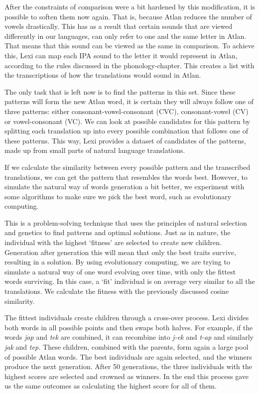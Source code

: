 After the constraints of comparison were a bit hardened by this modification, it is possible to soften them now again. That is, because Atlan reduces the number of vowels drastically. This has as a result that certain sounds that are viewed differently in our languages, can only refer to one and the same letter in Atlan. That means that this sound can be viewed as the same in comparison. To achieve this, Lexi can map each IPA sound to the letter it would represent in Atlan, according to the rules discussed in the phonology-chapter. This creates a list with the transcriptions of how the translations would sound in Atlan.  

The only task that is left now is to find the patterns in this set. Since these patterns will form the new Atlan word, it is certain they will always follow one of three patterns: either consonant-vowel-consonant (CVC), consonant-vowel (CV) or vowel-consonant (VC). We can look at possible candidates for this pattern by splitting each translation up into every possible combination that follows one of these patterns. This way, Lexi provides a dataset of candidates of the patterns, made up from small parts of natural language translations. 

If we calculate the similarity between every possible pattern and the transcribed translations, we can get the pattern that resembles the words best. However, to simulate the natural way of words generation a bit better, we experiment with some algorithms to make sure we pick the best word, such as evolutionary computing. 

This is a problem-solving technique that uses the principles of natural selection and genetics to find patterns and optimal solutions. Just as in nature, the individual with the highest ‘fitness’ are selected to create new children. Generation after generation this will mean that only the best traits survive, resulting in a solution. By using evolutionary computing, we are trying to simulate a natural way of one word evolving over time, with only the fittest words surviving. In this case, a ‘fit’ individual is on average very similar to all the translations. We calculate the fitness with the previously discussed cosine similarity. 

The fittest individuals create children through a cross-over process. Lexi divides both words in all possible points and then swaps both halves.  For example, if the words \textit{jap} and \textit{tek} are combined, it can recombine into \textit{j-ek} and \textit{t-ap} and similarly \textit{jak} and \textit{tep.} These children, combined with the parents, form again a large pool of possible Atlan words. The best individuals are again selected, and the winners produce the next generation. After 50 generations, the three individuals with the highest scores are selected and crowned as winners. In the end this process gave us the same outcomes as calculating the highest score for all of them. 

